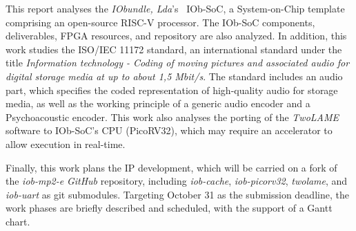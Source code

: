 This report analyses the \textit{IObundle, Lda}'s~\cite{iobundle} IOb-SoC, a
System-on-Chip template comprising an open-source RISC-V processor. The IOb-SoC
components, deliverables, FPGA resources, and repository are also analyzed.  In
addition, this work studies the ISO/IEC 11172 standard, an international
standard under the title \textit{Information technology - Coding of moving
pictures and associated audio for digital storage media at up to about 1,5
Mbit/s}. The standard includes an audio part, which specifies the coded
representation of high-quality audio for storage media, as well as the working
principle of a generic audio encoder and a Psychoacoustic encoder. This work
also analyses the porting of the \textit{TwoLAME} software to IOb-SoC's CPU
(PicoRV32), which may require an accelerator to allow execution in real-time.

Finally, this work plans the IP development, which will be carried on a fork of
the \textit{iob-mp2-e} \textit{GitHub} repository,
including \textit{iob-cache}, \textit{iob-picorv32}, \textit{twolame},
and \textit{iob-uart} as git submodules. Targeting October 31 as the submission
deadline, the work phases are briefly described and scheduled, with the support
of a Gantt chart.

